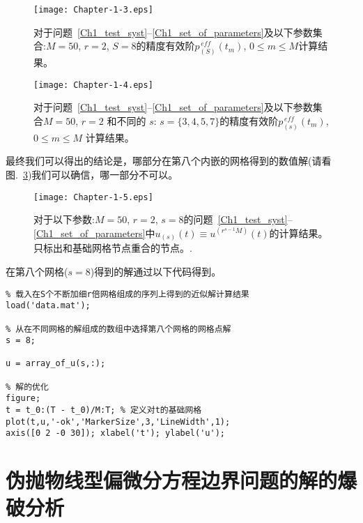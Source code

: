\documentclass[twoside]{book}
\begin{document}
\begin{CJK*}{GBK}{song}
\begin{figure}[t]
    \centering
    \texttt{[image: Chapter-1-3.eps]}\\
    \caption{对于问题~\eqref{Ch1_test_syst}--\eqref{Ch1_set_of_parameters}及以下参数集合:$M = 50$, $r = 2$, $S = 8$的精度有效阶$p^{\, eff}_{(S)}(t_m)$, $0 \leqslant m \leqslant M$计算结果。}
    \label{Fig_1_3}
\end{figure}

\begin{figure}[h!]
    \centering
    \texttt{[image: Chapter-1-4.eps]}\\
    \caption{对于问题~\eqref{Ch1_test_syst}--\eqref{Ch1_set_of_parameters}及以下参数集合$M = 50$, $r = 2$ 和不同的 $s$: $s = \{3,4,5,7\}$的精度有效阶$p^{\, eff}_{(s)}(t_m)$, $0 \leqslant m \leqslant M$ 计算结果。}
    \label{Fig_1_4}
\end{figure}

\newpage

最终我们可以得出的结论是，哪部分在第八个内嵌的网格得到的数值解(请看图.~\ref{Fig_1_5})我们可以确信，哪一部分不可以。
\begin{figure}[H]
    \centering
    \texttt{[image: Chapter-1-5.eps]}\\
    \caption{对于以下参数:$M = 50$, $r = 2$, $s = 8$的问题~\eqref{Ch1_test_syst}--\eqref{Ch1_set_of_parameters}中$u_{(s)}(t) \equiv u^{(r^{s - 1}M)}(t)$的计算结果。只标出和基础网格节点重合的节点。.}
    \label{Fig_1_5}
\end{figure}


\newpage

在第八个网格($s = 8$)得到的解通过以下代码得到。

%
\begin{lstlisting}
% 载入在S个不断加细r倍网格组成的序列上得到的近似解计算结果
load('data.mat');

% 从在不同网格的解组成的数组中选择第八个网格的网格点解
s = 8;

u = array_of_u(s,:);

% 解的优化
figure;
t = t_0:(T - t_0)/M:T; % 定义对t的基础网格
plot(t,u,'-ok','MarkerSize',3,'LineWidth',1);
axis([0 2 -0 30]); xlabel('t'); ylabel('u');
\end{lstlisting}





\newpage
\chapter{伪抛物线型偏微分方程边界问题的解的爆破分析}\label{Chapter_2}


\end{CJK*}
\end{document}

